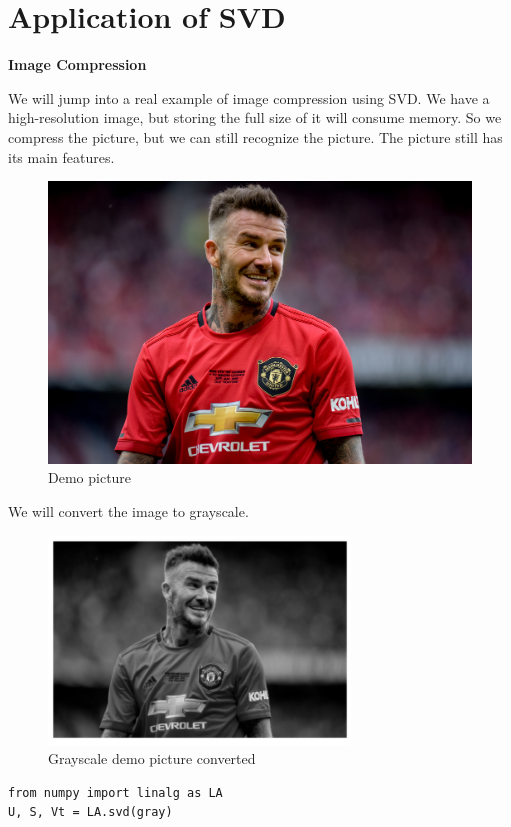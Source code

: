 \documentclass[a4paper, 12pt]{report}
\begin{document}
\section{Application of SVD}

\indent \textbf{\large Image Compression}\\
\indent \par We will jump into a real example of image compression using SVD. We have a high-resolution image, but storing the full size of it will consume memory. So we compress the picture, but we can still recognize the picture. The picture still has its main features.

\begin{figure}[H]
    \center
    \includegraphics[scale=0.3]{david-beckham.jpg}
    \caption{Demo picture}
\end{figure}

We will convert the image to grayscale.
\begin{figure}[H]
    \center
    \includegraphics[]{gray_david.png}
    \caption{Grayscale demo picture converted}
\end{figure}

\begin{verbatim}
from numpy import linalg as LA 
U, S, Vt = LA.svd(gray)
\end{verbatim}
\end{document}
